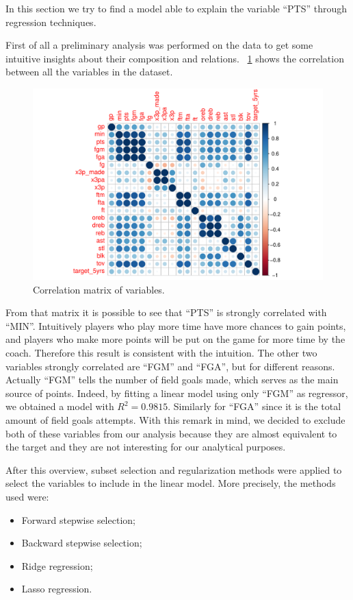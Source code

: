 In this section we try to find a model able to explain the variable ``PTS'' through regression techniques.

First of all a preliminary analysis was performed on the data to get some intuitive insights about their composition and relations.
\Fig~\ref{fig:CorrMatrix} shows the correlation between all the variables in the dataset.

\begin{figure}[H]
	\centering
	\includegraphics[width=0.7\linewidth]{ImageFiles/Regression/CorrMatrix.pdf}
	\caption{Correlation matrix of variables.}
	\label{fig:CorrMatrix}
\end{figure}

From that matrix it is possible to see that ``PTS'' is strongly correlated with ``MIN''. Intuitively players who play more time have more chances to gain points, and players who make more points will be put on the game for more time by the coach. Therefore this result is consistent with the intuition.
The other two variables strongly correlated are ``FGM'' and ``FGA'', but for different reasons. Actually ``FGM'' tells the number of field goals made, which serves as the main source of points. Indeed, by fitting a linear model using only ``FGM'' as regressor, we obtained a model with $R^2 = 0.9815$. Similarly for ``FGA'' since it is the total amount of field goals attempts. With this remark in mind, we decided to exclude both of these variables from our analysis because they are almost equivalent to the target and they are not interesting for our analytical purposes.

After this overview, subset selection and regularization methods were applied to select the variables to include in the linear model. More precisely, the methods used were:
\begin{itemize}
	\item Forward stepwise selection;
	\item Backward stepwise selection;
	\item Ridge regression;
	\item Lasso regression.
\end{itemize}

